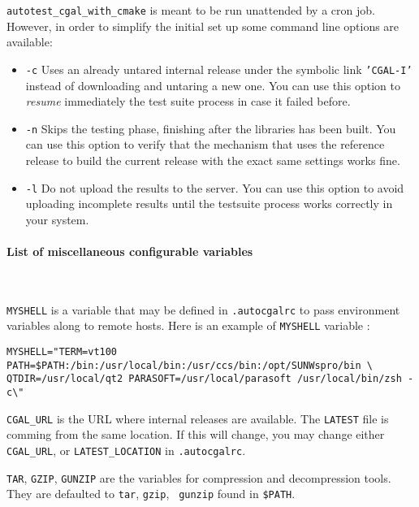 {\tt autotest\_cgal\_with\_cmake} is meant to be run unattended by a cron job. 
However, in order to simplify the initial set up some command line options are available:

\begin{itemize}
   \item {\tt -c} Uses an already untared internal release under the
                  symbolic link {\tt 'CGAL-I'} instead of
                  downloading and untaring a new one. You can use this option
                  to {\em resume} immediately the test suite process in case it
                  failed before.

   \item {\tt -n} Skips the testing phase, finishing after the libraries has been built.
                  You can use this option to verify that the mechanism that uses the
                  reference release to build the current release with the exact same
                  settings works fine.

   \item {\tt -l} Do not upload the results to the server.
                  You can use this option to avoid uploading incomplete results until
                  the testsuite process works correctly in your system.
\end{itemize}

\paragraph{List of miscellaneous configurable variables} ~

{\tt MYSHELL} is a variable that may be defined in {\tt .autocgalrc}
to pass environment variables along to remote hosts. Here is an example of {\tt MYSHELL}
variable :
\begin{verbatim}
MYSHELL="TERM=vt100 PATH=$PATH:/bin:/usr/local/bin:/usr/ccs/bin:/opt/SUNWspro/bin \
QTDIR=/usr/local/qt2 PARASOFT=/usr/local/parasoft /usr/local/bin/zsh -c\"
\end{verbatim}

{\tt CGAL\_URL} is the URL where internal releases are available.
The {\tt LATEST} file is comming from the same location. If this will change,
you may change either {\tt CGAL\_URL}, or {\tt LATEST\_LOCATION}
in {\tt .autocgalrc}.

{\tt TAR}, {\tt GZIP}, {\tt GUNZIP} are the variables for compression and
decompression tools.  They are defaulted to {\tt tar}, {\tt gzip}, {\tt
gunzip} found in {\tt \$PATH}.

